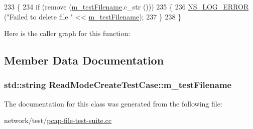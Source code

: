 \begin{DoxyCode}
233 \{
234   \textcolor{keywordflow}{if} (\textcolor{keyword}{remove} (\hyperlink{classReadModeCreateTestCase_a0a968af3869b8882c86cd593a55667ef}{m\_testFilename}.c\_str ()))
235     \{
236       \hyperlink{group__logging_ga0261a8db1d4ac5f79417d117634fd455}{NS\_LOG\_ERROR} (\textcolor{stringliteral}{"Failed to delete file "} << \hyperlink{classReadModeCreateTestCase_a0a968af3869b8882c86cd593a55667ef}{m\_testFilename});
237     \}
238 \}
\end{DoxyCode}


Here is the caller graph for this function\+:




\subsection{Member Data Documentation}
\subsubsection[{\texorpdfstring{m\+\_\+test\+Filename}{m_testFilename}}]{\setlength{\rightskip}{0pt plus 5cm}std\+::string Read\+Mode\+Create\+Test\+Case\+::m\+\_\+test\+Filename\hspace{0.3cm}{\ttfamily [private]}}\hypertarget{classReadModeCreateTestCase_a0a968af3869b8882c86cd593a55667ef}{}\label{classReadModeCreateTestCase_a0a968af3869b8882c86cd593a55667ef}


The documentation for this class was generated from the following file\+:\begin{DoxyCompactItemize}
\item 
network/test/\hyperlink{pcap-file-test-suite_8cc}{pcap-\/file-\/test-\/suite.\+cc}\end{DoxyCompactItemize}
